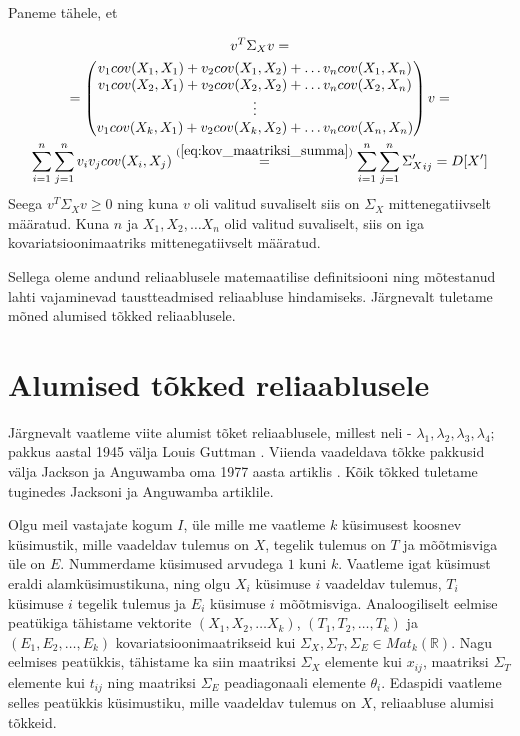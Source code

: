 \documentclass[a4paper,12pt]{article}
\numberwithin{equation}{section}
\theoremstyle{definition}
\begin{document}
Paneme tähele, et 

\begin{gather*}
v^T \Sigma_X v = \\
= \begin{pmatrix}
v_1 cov(X_1,X_1) + v_2 cov(X_1,X_2) + \hdots v_n cov(X_1,X_n) \\
v_1 cov(X_2,X_1) + v_2 cov(X_2,X_2) + \hdots v_n cov(X_2,X_n) \\
\vdots \\
v_1 cov(X_k,X_1) + v_2 cov(X_k,X_2) + \ldots v_n cov(X_n,X_n) \\
\end{pmatrix} v = \\  \sum \limits_{i=1}^n \sum \limits_{j=1}^n v_i v_j cov(X_i,X_j)  \overset{(\ref{eq:kov_maatriksi_summa})}{=} \sum \limits_{i=1}^n \sum \limits_{j=1}^n {\Sigma_X'}_{ij} = D[X']
\end{gather*}
Seega $v^T \Sigma_X v \geq 0$ ning kuna $v$ oli valitud suvaliselt siis on $\Sigma_X$ mittenegatiivselt määratud. Kuna $n$ ja $X_1,X_2,\ldots X_n$ olid valitud suvaliselt, siis on iga kovariatsioonimaatriks mittenegatiivselt määratud. 

Sellega oleme andund reliaablusele matemaatilise definitsiooni ning mõtestanud lahti vajaminevad taustteadmised reliaabluse hindamiseks. Järgnevalt tuletame mõned alumised tõkked reliaablusele.   

  


\section{Alumised tõkked reliaablusele}

Järgnevalt vaatleme viite alumist tõket reliaablusele, millest neli - $\lambda_1,\lambda_2,\lambda_3,\lambda_4$; pakkus aastal 1945 välja Louis Guttman \cite{Guttman1945}. Viienda vaadeldava tõkke pakkusid välja Jackson ja Anguwamba oma 1977 aasta artiklis \cite{Jackson1977}. Kõik tõkked tuletame tuginedes Jacksoni ja Anguwamba artiklile.

Olgu meil vastajate kogum $I$, üle mille me vaatleme $k$ küsimusest koosnev küsimustik, mille vaadeldav tulemus on $X$, tegelik tulemus on $T$ ja mõõtmisviga üle on $E$. Nummerdame küsimused arvudega $1$ kuni $k$. Vaatleme igat küsimust eraldi alamküsimustikuna, ning olgu $X_i$ küsimuse $i$ vaadeldav tulemus, $T_i$ küsimuse $i$ tegelik tulemus ja $E_i$ küsimuse $i$ mõõtmisviga. Analoogiliselt eelmise peatükiga tähistame vektorite $(X_1,X_2,\ldots X_k)$, $(T_1,T_2,\ldots,T_k)$ ja $(E_1,E_2,\ldots,E_k)$ kovariatsioonimaatrikseid kui $\Sigma_X,\Sigma_T,\Sigma_E \in Mat_{k}\left(\mathbb{R}\right)$. Nagu eelmises peatükkis, tähistame ka siin maatriksi $\Sigma_X$ elemente kui $x_{ij}$, maatriksi $\Sigma_T$ elemente kui $t_{ij}$ ning maatriksi $\Sigma_E$ peadiagonaali elemente $\theta_i$. Edaspidi vaatleme selles peatükkis küsimustiku, mille vaadeldav tulemus on $X$, reliaabluse alumisi tõkkeid.
\end{document}
